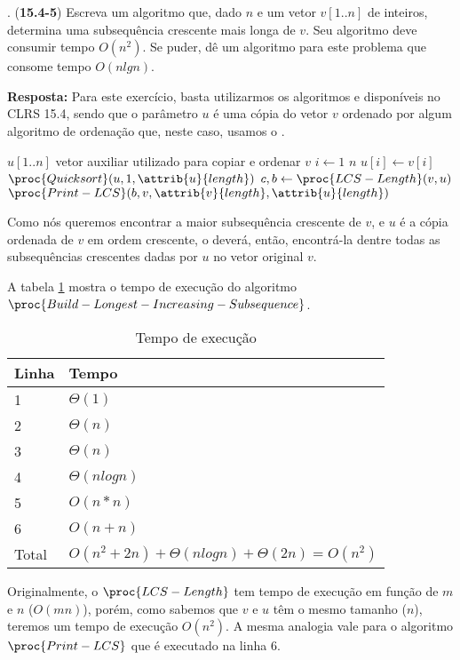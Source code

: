 
. (\textbf{15.4-5})  Escreva um algoritmo que, dado $n$ e um vetor $v[1..n]$ de inteiros, determina uma subsequência crescente mais longa de $v$. Seu algoritmo deve consumir tempo $O(n^2)$. Se puder, dê um algoritmo para este problema que consome tempo $O(n lg n)$.

\textbf{Resposta:} Para este exercício, basta utilizarmos os algoritmos  e  disponíveis no CLRS 15.4, sendo que o parâmetro $u$ é uma cópia do vetor $v$ ordenado por algum algoritmo de ordenação que, neste caso, usamos o .

\begin{codebox}
\li $u[1..n]$ vetor auxiliar utilizado para copiar e ordenar $v$
\li \For $i \gets 1$ \To $n$
\li \Do
        $u[i] \gets v[i]$
    \End
\li $\proc{Quicksort}(u, 1, \attrib{u}{length})$
\li	$c, b \gets \proc{LCS-Length}(v, u)$
\li	$\proc{Print-LCS}(b, v, \attrib{v}{length}, \attrib{u}{length})$
\end{codebox}

Como nós queremos encontrar a maior subsequência crescente de $v$, e $u$ é a cópia ordenada de $v$ em ordem crescente, o  deverá, então, encontrá-la dentre todas as subsequências crescentes dadas por $u$ no vetor original $v$.

A tabela \ref{tbl:6-4-1} mostra o tempo de execução do algoritmo $\proc{Build-Longest-Increasing-Subsequence}$.

\begin{table}[H]
\centering
\begin{tabular}{|l|l|}
\hline
Linha                   & Tempo \\ \hline
1 & $\Theta(1)$ \\ \hline
2 & $\Theta(n)$ \\ \hline
3 & $\Theta(n)$ \\ \hline
4 & $\Theta(n log n)$ \\ \hline
5 & $O(n * n)$ \\ \hline
6 & $O(n + n)$ \\ \hline
Total & $O(n^2 + 2n) + \Theta(n log n) + \Theta(2n) = O(n^2)$ \\ \hline
\end{tabular}
\caption{Tempo de execução}
\label{tbl:6-4-1}
\end{table}

Originalmente, o $\proc{LCS-Length}$ tem tempo de execução em função de $m$ e $n$ ($O(mn)$), porém, como sabemos que $v$ e $u$ têm o mesmo tamanho ($n$), teremos um tempo de execução $O(n^2)$. A mesma analogia vale para o algoritmo $\proc{Print-LCS}$ que é executado na linha 6.